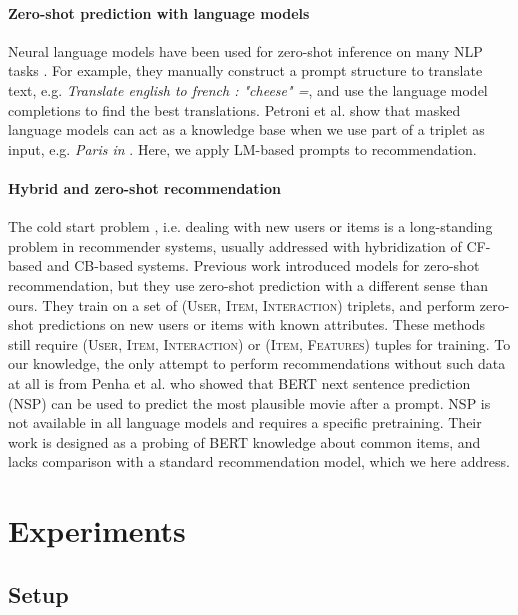 \documentclass[runningheads]{llncs}
\begin{document}
\paragraph{\textbf{Zero-shot prediction with language models}} Neural language models have been used for zero-shot inference on many NLP tasks \cite{radford2019language,brown2020language}. For example, they manually construct a prompt structure to translate text, e.g. \textit{Translate english to french : "cheese" =}, and use the language model completions to find the best translations.   Petroni et al. \cite{petroni2019} show that masked language models can act as a knowledge base when we use part of a triplet as input, e.g. \textit{Paris in }.  Here, we apply LM-based prompts to recommendation.
\vspace{-0.15cm}

\paragraph{\textbf{Hybrid and zero-shot recommendation}}  The cold start problem \cite{Schein2002}, i.e. dealing with new users or items is a long-standing problem in recommender systems, usually addressed with hybridization of CF-based and CB-based systems.  Previous work \cite{Volkovs17,li2019zero,ding2021zeroshot,Feng21} introduced models for zero-shot recommendation, but they use zero-shot prediction with a different sense than ours. They train on a set of  {\textsc{(User, Item, Interaction)}} triplets, and perform zero-shot predictions on new users or items with known attributes.
These methods still require \textsc{(User, Item, Interaction)} or \textsc{(Item, Features)} tuples for training. To our knowledge, the only attempt to perform recommendations without such data at all is from Penha et al. \cite{Penha20} who showed that BERT \cite{devlin-etal-2019-bert} next sentence prediction (NSP) can be used to predict the most plausible movie after a prompt. NSP is not available in all language models and requires a specific pretraining. Their work is designed as a probing of BERT knowledge about common items, and lacks comparison with a standard recommendation model, which we here address.




\section{Experiments}
\subsection{Setup}
 \vspace{-0.1cm}
\end{document}
